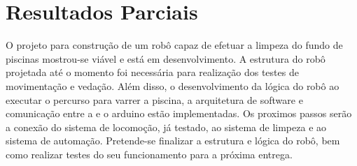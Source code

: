 \chapter{Resultados Parciais}
O projeto para construção de um robô capaz de efetuar a limpeza do fundo de piscinas mostrou-se viável e está em desenvolvimento. A estrutura do robô projetada até o momento foi necessária para realização dos testes de movimentação e vedação. Além disso, o desenvolvimento da lógica do robô ao executar o percurso para varrer a piscina, a arquitetura de software e comunicação entre a  e o arduino estão implementadas. Os proximos passos serão a conexão do sistema de locomoção, já testado, ao sistema de limpeza e ao sistema de automação. Pretende-se finalizar a estrutura e lógica do robô, bem como realizar testes do seu funcionamento para a próxima entrega.
